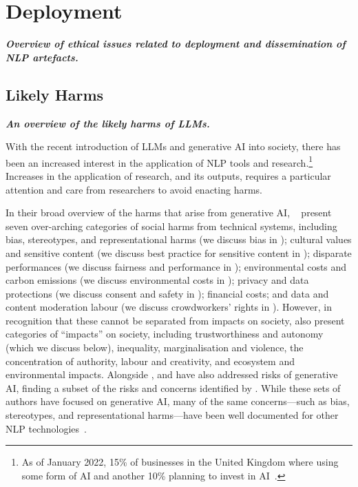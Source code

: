 \section{Deployment}\label{sec:deploy}
\noindent\textbf{\textit{Overview of ethical issues related to deployment and dissemination of NLP artefacts.}}

\subsection{Likely Harms}\label{subsec:harms}\noindent\textbf{\textit{An overview of the likely harms of LLMs.}}
\newline 

\noindent With the recent introduction of LLMs and generative AI into society, there has been an increased interest in the application of NLP tools and research.\footnote{As of January 2022, 15\% of businesses in the United Kingdom where using some form of AI and another 10\% planning to invest in AI~\cite{CapitalEconomics_AI_2022}.} 
Increases in the application of research, and its outputs, requires a particular attention and care from researchers to avoid enacting harms.

In their broad overview of the harms that arise from generative AI, ~\citet{Solaiman_Evaluating_2024} present seven over-arching categories of social harms from technical systems, including bias, stereotypes, and representational harms (we discuss bias in ); cultural values and sensitive content (we discuss best practice for sensitive content in ); disparate performances (we discuss fairness and performance in ); environmental costs and carbon emissions (we discuss environmental costs in ); privacy and data protections (we discuss consent and safety in ); financial costs; and data and content moderation labour (we discuss crowdworkers' rights in ). However, in recognition that these cannot be separated from impacts on society, \citet{Solaiman_Evaluating_2024} also present categories of ``impacts'' on society, including trustworthiness and autonomy (which we discuss below), %
inequality, marginalisation and violence, %
the concentration of authority, %
labour and creativity, %
and ecosystem and environmental impacts. %
Alongside \citet{Solaiman_Evaluating_2024}, \citet{weidinger_ethical_2021} and \citet{kumar_language_2022} have also addressed risks of generative AI, finding a subset of the risks and concerns identified by \citet{Solaiman_Evaluating_2024}. While these sets of authors have focused on generative AI, many of the same concerns---such as bias, stereotypes, and representational harms---have been well documented for other NLP technologies~\cite[e.g.,][]{Anand_Don_2024,Bolukbasi_Man_2016,Davidson_Racial_2019,De-Arteaga_Bias_2019}.

